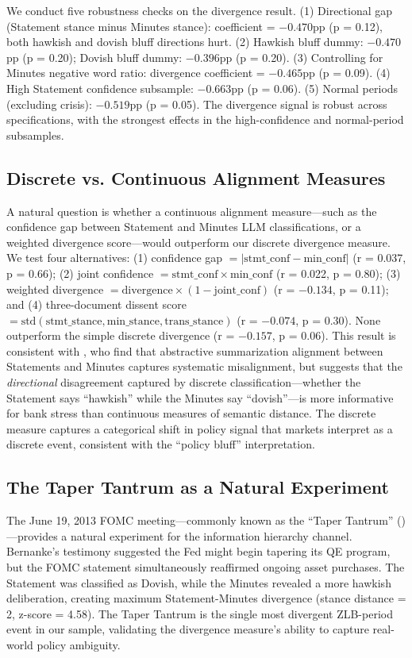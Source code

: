 \documentclass[12pt,a4paper]{article}
\begin{document}
We conduct five robustness checks on the divergence result. (1) Directional gap (Statement stance minus Minutes stance): coefficient = $-0.470$pp (p = 0.12), both hawkish and dovish bluff directions hurt. (2) Hawkish bluff dummy: $-0.470$pp (p = 0.20); Dovish bluff dummy: $-0.396$pp (p = 0.20). (3) Controlling for Minutes negative word ratio: divergence coefficient = $-0.465$pp (p = 0.09). (4) High Statement confidence subsample: $-0.663$pp (p = 0.06). (5) Normal periods (excluding crisis): $-0.519$pp (p = 0.05). The divergence signal is robust across specifications, with the strongest effects in the high-confidence and normal-period subsamples.

\subsection{Discrete vs. Continuous Alignment Measures}

A natural question is whether a continuous alignment measure---such as the confidence gap between Statement and Minutes LLM classifications, or a weighted divergence score---would outperform our discrete divergence measure. We test four alternatives: (1) confidence gap $= |\text{stmt\_conf} - \text{min\_conf}|$ (r = 0.037, p = 0.66); (2) joint confidence $= \text{stmt\_conf} \times \text{min\_conf}$ (r = 0.022, p = 0.80); (3) weighted divergence $= \text{divergence} \times (1 - \text{joint\_conf})$ (r = $-0.134$, p = 0.11); and (4) three-document dissent score $= \text{std}(\text{stmt\_stance}, \text{min\_stance}, \text{trans\_stance})$ (r = $-0.074$, p = 0.30). None outperform the simple discrete divergence (r = $-0.157$, p = 0.06). This result is consistent with \citet{Li2025}, who find that abstractive summarization alignment between Statements and Minutes captures systematic misalignment, but suggests that the \textit{directional} disagreement captured by discrete classification---whether the Statement says ``hawkish'' while the Minutes say ``dovish''---is more informative for bank stress than continuous measures of semantic distance. The discrete measure captures a categorical shift in policy signal that markets interpret as a discrete event, consistent with the ``policy bluff'' interpretation.

\subsection{The Taper Tantrum as a Natural Experiment}

The June 19, 2013 FOMC meeting---commonly known as the ``Taper Tantrum'' (\citet{Bernanke2005})---provides a natural experiment for the information hierarchy channel. Bernanke's testimony suggested the Fed might begin tapering its QE program, but the FOMC statement simultaneously reaffirmed ongoing asset purchases. The Statement was classified as Dovish, while the Minutes revealed a more hawkish deliberation, creating maximum Statement-Minutes divergence (stance distance = 2, z-score = 4.58). The Taper Tantrum is the single most divergent ZLB-period event in our sample, validating the divergence measure's ability to capture real-world policy ambiguity.
\end{document}
